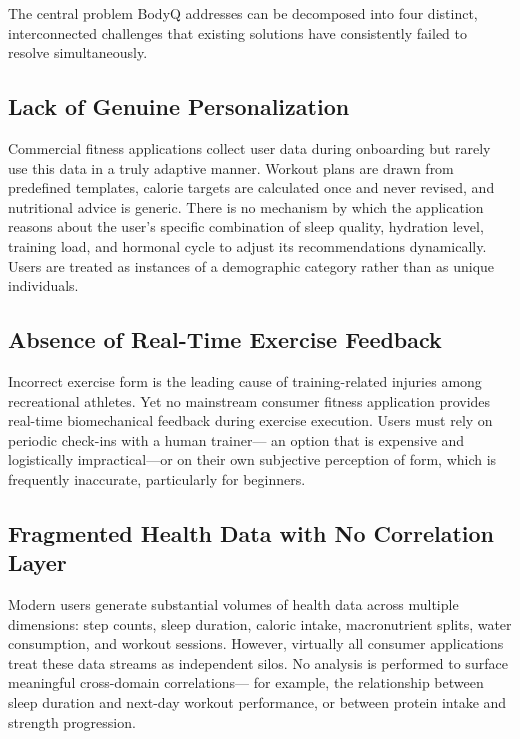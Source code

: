 The central problem BodyQ addresses can be decomposed into four distinct,
interconnected challenges that existing solutions have consistently
failed to resolve simultaneously.

\subsection{Lack of Genuine Personalization}

Commercial fitness applications collect user data during onboarding but
rarely use this data in a truly adaptive manner. Workout plans are drawn
from predefined templates, calorie targets are calculated once and never
revised, and nutritional advice is generic. There is no mechanism by
which the application reasons about the user's specific combination of
sleep quality, hydration level, training load, and hormonal cycle to
adjust its recommendations dynamically. Users are treated as instances
of a demographic category rather than as unique individuals.

\subsection{Absence of Real-Time Exercise Feedback}

Incorrect exercise form is the leading cause of training-related injuries
among recreational athletes. Yet no mainstream consumer fitness
application provides real-time biomechanical feedback during exercise
execution. Users must rely on periodic check-ins with a human trainer---
an option that is expensive and logistically impractical---or on their
own subjective perception of form, which is frequently inaccurate,
particularly for beginners.

\subsection{Fragmented Health Data with No Correlation Layer}

Modern users generate substantial volumes of health data across multiple
dimensions: step counts, sleep duration, caloric intake, macronutrient
splits, water consumption, and workout sessions. However, virtually all
consumer applications treat these data streams as independent silos. No
analysis is performed to surface meaningful cross-domain correlations---
for example, the relationship between sleep duration and next-day workout
performance, or between protein intake and strength progression.


